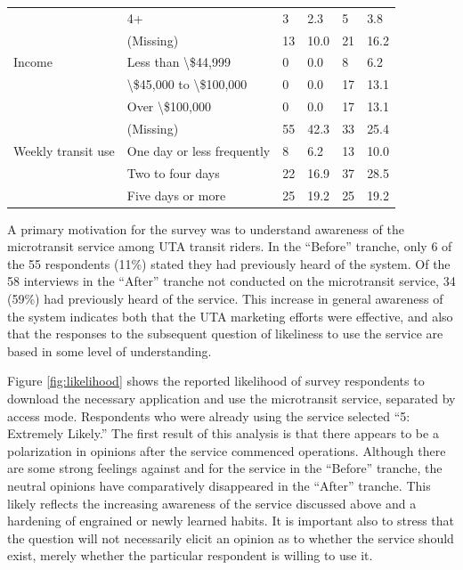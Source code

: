 \documentclass[smartcities,article,submit,moreauthors,pdftex]{Definitions/mdpi}
\begin{document}
\begin{table}[ht]
\begin{tabular}[t]{llllll}
 & 4+ & 3 & 2.3 & 5 & 3.8\\
 & (Missing) & 13 & 10.0 & 21 & 16.2\\
Income & Less than \textbackslash{}\$44,999 & 0 & 0.0 & 8 & 6.2\\
 & \textbackslash{}\$45,000 to \textbackslash{}\$100,000 & 0 & 0.0 & 17 & 13.1\\
 & Over \textbackslash{}\$100,000 & 0 & 0.0 & 17 & 13.1\\
 & (Missing) & 55 & 42.3 & 33 & 25.4\\
Weekly transit use & One day or less frequently & 8 & 6.2 & 13 & 10.0\\
 & Two to four days & 22 & 16.9 & 37 & 28.5\\
 & Five days or more & 25 & 19.2 & 25 & 19.2\\
\bottomrule
\end{tabular}
\end{table}


A primary motivation for the survey was to understand awareness of the microtransit service among UTA transit riders. In the “Before” tranche, only 6 of the 55 respondents (11\%) stated they had previously heard of the system. Of the 58 interviews in the “After” tranche not conducted on the microtransit service, 34 (59\%) had previously heard of the service. This increase in general awareness of the system indicates both that the UTA marketing efforts were effective, and also that the responses to the subsequent question of likeliness to use the service are based in some level of understanding.

Figure \ref{fig:likelihood} shows the reported likelihood of survey respondents to download the necessary application and use the microtransit service, separated by access mode. Respondents who were already using the service selected “5: Extremely Likely.” The first result of this analysis is that there appears to be a polarization in opinions after the service commenced operations. Although there are some strong feelings against and for the service in the “Before” tranche, the neutral opinions have comparatively disappeared in the “After” tranche. This likely reflects the increasing awareness of the service discussed above and a hardening of engrained or newly learned habits. It is important also to stress that the question will not necessarily elicit an opinion as to whether the service should exist, merely whether the particular respondent is willing to use it.
\end{document}
